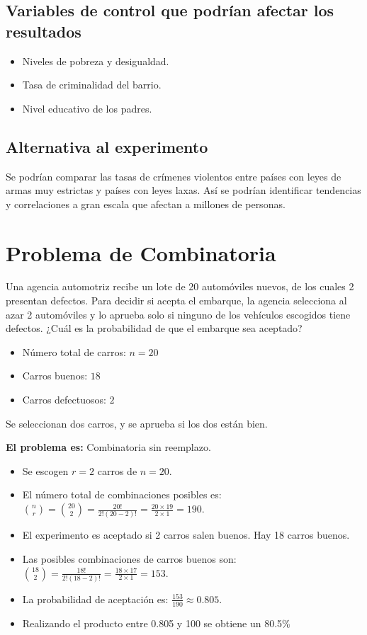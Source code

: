 \documentclass[12pt]{article}
\begin{document}
\subsection{Variables de control que podrían afectar los resultados}

\begin{itemize}
\item Niveles de pobreza y desigualdad. 

\item Tasa de criminalidad del barrio. 

\item Nivel educativo de los padres.

\end{itemize}

\subsection{Alternativa al experimento}

Se podrían comparar las tasas de crímenes violentos entre países con leyes de armas muy estrictas y países con leyes laxas. 
Así se podrían identificar tendencias y correlaciones a gran escala que afectan a millones de personas.

\section{Problema de Combinatoria}
Una agencia automotriz recibe un lote de 20 automóviles nuevos, de los cuales 2 presentan defectos. Para decidir si acepta el embarque, la agencia selecciona al azar 2 automóviles y lo aprueba solo si ninguno de los vehículos escogidos tiene defectos. ¿Cuál es la probabilidad de que el embarque sea aceptado?

\begin{itemize}
    \item Número total de carros: $n = 20$
    \item Carros buenos: $18$
    \item Carros defectuosos: $2$
\end{itemize}

Se seleccionan dos carros, y se aprueba si los dos están bien.

\textbf{El problema es:} Combinatoria sin reemplazo.
\begin{itemize}
    \item Se escogen $r=2$ carros de $n=20$.
    \item El número total de combinaciones posibles es: $\binom{n}{r}=\binom{20}{2}=\frac{20!}{2!(20-2)!}=\frac{20 \times 19}{2 \times 1}=190$.
    \item El experimento es aceptado si 2 carros salen buenos. Hay 18 carros buenos.
    \item Las posibles combinaciones de carros buenos son: $\binom{18}{2}=\frac{18!}{2!(18-2)!}=\frac{18 \times 17}{2 \times 1}=153$.
    \item La probabilidad de aceptación es: $\frac{153}{190} \approx 0.805$.
    \item Realizando el producto entre 0.805 y 100 se obtiene un 80.5\%
\end{itemize}
\end{document}
